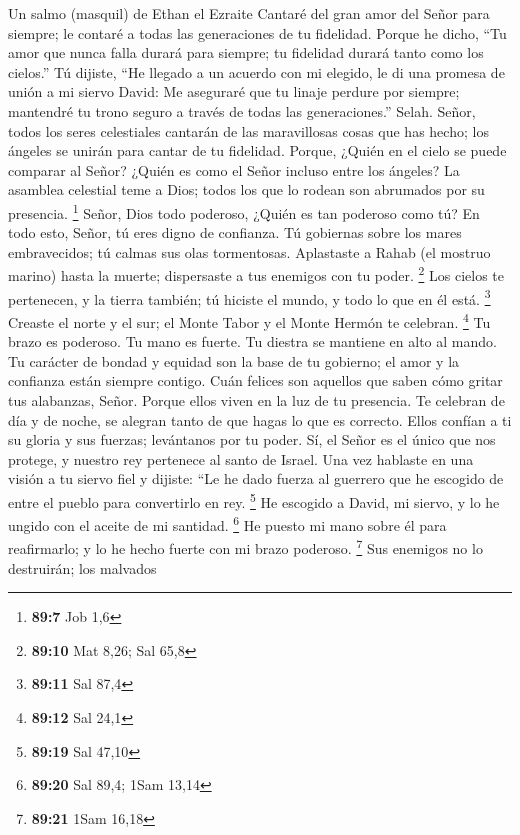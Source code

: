 Un salmo (masquil) de Ethan el Ezraite  Cantaré del gran
amor del Señor para siempre; le contaré a todas las generaciones de tu
fidelidad.  Porque he dicho, ``Tu amor que nunca falla
durará para siempre; tu fidelidad durará tanto como los cielos.''
 Tú dijiste, ``He llegado a un acuerdo con mi elegido, le di
una promesa de unión a mi siervo David:  Me aseguraré que tu
linaje perdure por siempre; mantendré tu trono seguro a través de todas
las generaciones.'' Selah.  Señor, todos los seres
celestiales cantarán de las maravillosas cosas que has hecho; los
ángeles se unirán para cantar de tu fidelidad.  Porque,
¿Quién en el cielo se puede comparar al Señor? ¿Quién es como el Señor
incluso entre los ángeles?  La asamblea celestial teme a
Dios; todos los que lo rodean son abrumados por su presencia.
\footnote{\textbf{89:7} Job 1,6}  Señor, Dios todo poderoso,
¿Quién es tan poderoso como tú? En todo esto, Señor, tú eres digno de
confianza.  Tú gobiernas sobre los mares embravecidos; tú
calmas sus olas tormentosas.  Aplastaste a Rahab (el
mostruo marino) hasta la muerte; dispersaste a tus enemigos con tu
poder. \footnote{\textbf{89:10} Mat 8,26; Sal 65,8}  Los
cielos te pertenecen, y la tierra también; tú hiciste el mundo, y todo
lo que en él está. \footnote{\textbf{89:11} Sal 87,4} 
Creaste el norte y el sur; el Monte Tabor y el Monte Hermón te celebran.
\footnote{\textbf{89:12} Sal 24,1}  Tu brazo es poderoso.
Tu mano es fuerte. Tu diestra se mantiene en alto al mando.
 Tu carácter de bondad y equidad son la base de tu
gobierno; el amor y la confianza están siempre contigo. 
Cuán felices son aquellos que saben cómo gritar tus alabanzas, Señor.
Porque ellos viven en la luz de tu presencia.  Te celebran
de día y de noche, se alegran tanto de que hagas lo que es correcto.
 Ellos confían a ti su gloria y sus fuerzas; levántanos por
tu poder.  Sí, el Señor es el único que nos protege, y
nuestro rey pertenece al santo de Israel.  Una vez hablaste
en una visión a tu siervo fiel y dijiste: ``Le he dado fuerza al
guerrero que he escogido de entre el pueblo para convertirlo en rey.
\footnote{\textbf{89:19} Sal 47,10}  He escogido a David,
mi siervo, y lo he ungido con el aceite de mi santidad. \footnote{\textbf{89:20}
  Sal 89,4; 1Sam 13,14}  He puesto mi mano sobre él para
reafirmarlo; y lo he hecho fuerte con mi brazo poderoso. \footnote{\textbf{89:21}
  1Sam 16,18}  Sus enemigos no lo destruirán; los malvados
